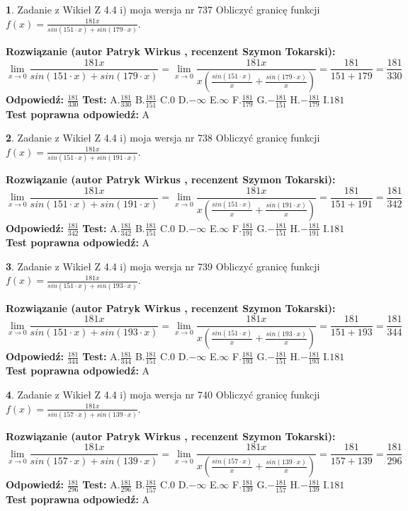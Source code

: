 \documentclass[12pt, a4paper]{article}
\theoremstyle{definition} %
\newtheorem{zad}{}
\newcommand{\zadStart}[1]{\begin{zad}#1\newline}
\newcommand{\zadStop}{\end{zad}}
\newcommand{\rozwStart}[2]{\noindent \textbf{Rozwiązanie (autor #1 , recenzent #2): }\newline}
\newcommand{\rozwStop}{\newline}
\newcommand{\odpStart}{\noindent \textbf{Odpowiedź:}\newline}
\newcommand{\odpStop}{\newline}
\newcommand{\testStart}{\noindent \textbf{Test:}\newline}
\newcommand{\testStop}{\newline}
\newcommand{\kluczStart}{\noindent \textbf{Test poprawna odpowiedź:}\newline}
\newcommand{\kluczStop}{\newline}
\begin{document}
\zadStart{Zadanie z Wikieł Z 4.4 i) moja wersja nr 737}
Obliczyć granicę funkcji $f(x)=\frac{181x}{sin(151\cdot x) +sin(179\cdot x)}$.
\zadStop
\rozwStart{Patryk Wirkus}{Szymon Tokarski}
$$\lim\limits_{x\to 0}\frac{181x}{sin(151\cdot x) +sin(179\cdot x)}=\lim\limits_{x\to 0}\frac{181x}{x(\frac{sin(151\cdot x)}{x}+\frac{sin(179\cdot x)}{x})}=\frac{181}{151+179} = \frac{181}{330}$$
\rozwStop
\odpStart
$\frac{181}{330}$
\odpStop
\testStart
A.$\frac{181}{330}$
B.$\frac{181}{151}$
C.$0$
D.$-\infty$
E.$\infty$
F.$\frac{181}{179}$
G.$-\frac{181}{151}$
H.$-\frac{181}{179}$
I.$181$
\testStop
\kluczStart
A
\kluczStop



\zadStart{Zadanie z Wikieł Z 4.4 i) moja wersja nr 738}
Obliczyć granicę funkcji $f(x)=\frac{181x}{sin(151\cdot x) +sin(191\cdot x)}$.
\zadStop
\rozwStart{Patryk Wirkus}{Szymon Tokarski}
$$\lim\limits_{x\to 0}\frac{181x}{sin(151\cdot x) +sin(191\cdot x)}=\lim\limits_{x\to 0}\frac{181x}{x(\frac{sin(151\cdot x)}{x}+\frac{sin(191\cdot x)}{x})}=\frac{181}{151+191} = \frac{181}{342}$$
\rozwStop
\odpStart
$\frac{181}{342}$
\odpStop
\testStart
A.$\frac{181}{342}$
B.$\frac{181}{151}$
C.$0$
D.$-\infty$
E.$\infty$
F.$\frac{181}{191}$
G.$-\frac{181}{151}$
H.$-\frac{181}{191}$
I.$181$
\testStop
\kluczStart
A
\kluczStop



\zadStart{Zadanie z Wikieł Z 4.4 i) moja wersja nr 739}
Obliczyć granicę funkcji $f(x)=\frac{181x}{sin(151\cdot x) +sin(193\cdot x)}$.
\zadStop
\rozwStart{Patryk Wirkus}{Szymon Tokarski}
$$\lim\limits_{x\to 0}\frac{181x}{sin(151\cdot x) +sin(193\cdot x)}=\lim\limits_{x\to 0}\frac{181x}{x(\frac{sin(151\cdot x)}{x}+\frac{sin(193\cdot x)}{x})}=\frac{181}{151+193} = \frac{181}{344}$$
\rozwStop
\odpStart
$\frac{181}{344}$
\odpStop
\testStart
A.$\frac{181}{344}$
B.$\frac{181}{151}$
C.$0$
D.$-\infty$
E.$\infty$
F.$\frac{181}{193}$
G.$-\frac{181}{151}$
H.$-\frac{181}{193}$
I.$181$
\testStop
\kluczStart
A
\kluczStop



\zadStart{Zadanie z Wikieł Z 4.4 i) moja wersja nr 740}
Obliczyć granicę funkcji $f(x)=\frac{181x}{sin(157\cdot x) +sin(139\cdot x)}$.
\zadStop
\rozwStart{Patryk Wirkus}{Szymon Tokarski}
$$\lim\limits_{x\to 0}\frac{181x}{sin(157\cdot x) +sin(139\cdot x)}=\lim\limits_{x\to 0}\frac{181x}{x(\frac{sin(157\cdot x)}{x}+\frac{sin(139\cdot x)}{x})}=\frac{181}{157+139} = \frac{181}{296}$$
\rozwStop
\odpStart
$\frac{181}{296}$
\odpStop
\testStart
A.$\frac{181}{296}$
B.$\frac{181}{157}$
C.$0$
D.$-\infty$
E.$\infty$
F.$\frac{181}{139}$
G.$-\frac{181}{157}$
H.$-\frac{181}{139}$
I.$181$
\testStop
\kluczStart
A
\kluczStop
\end{document}
